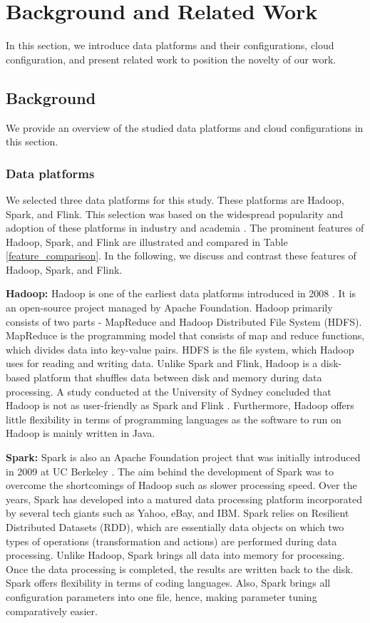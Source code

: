 \documentclass[3p]{elsarticle}
\begin{document}
\section{Background and Related Work}
In this section, we introduce data platforms and their configurations, cloud configuration, and present related work to position the novelty of our work.
\subsection{Background}\label{background}

We provide an overview of the studied data platforms and cloud configurations in this section.
\subsubsection{Data platforms}\label{data_platforms}
We selected three data platforms for this study. These platforms are Hadoop, Spark, and Flink. This selection was based on the widespread popularity and adoption of these platforms in industry and academia \cite{oussous2018big, inoubli2018experimental}. The prominent features of Hadoop, Spark, and Flink are illustrated and compared in Table \ref{feature_comparison}. In the following, we discuss and contrast these features of Hadoop, Spark, and Flink.



\textbf{Hadoop:} Hadoop is one of the earliest data platforms introduced in 2008 \cite{polato2014comprehensive}. It is an open-source project managed by Apache Foundation. Hadoop primarily consists of two parts - MapReduce and Hadoop Distributed File System (HDFS). MapReduce is the programming model that consists of map and reduce functions, which divides data into key-value pairs. HDFS is the file system, which Hadoop uses for reading and writing data. Unlike Spark and Flink, Hadoop is a disk-based platform that shuffles data between disk and memory during data processing. A study conducted at the University of Sydney concluded that Hadoop is not as user-friendly as Spark and Flink \cite{akil2017usability}. Furthermore, Hadoop offers little flexibility in terms of programming languages as the software to run on Hadoop is mainly written in Java.

\textbf{Spark:} Spark is also an Apache Foundation project that was initially introduced in 2009 at UC Berkeley \cite{zaharia2010spark}. The aim behind the development of Spark was to overcome the shortcomings of Hadoop such as slower processing speed. Over the years, Spark has developed into a matured data processing platform incorporated by several tech giants such as Yahoo, eBay, and IBM. Spark relies on Resilient Distributed Datasets (RDD), which are essentially data objects on which two types of operations (transformation and actions) are performed during data processing. Unlike Hadoop, Spark brings all data into memory for processing. Once the data processing is completed, the results are written back to the disk. Spark offers flexibility in terms of coding languages. Also, Spark brings all configuration parameters into one file, hence, making parameter tuning comparatively easier.  
\end{document}
